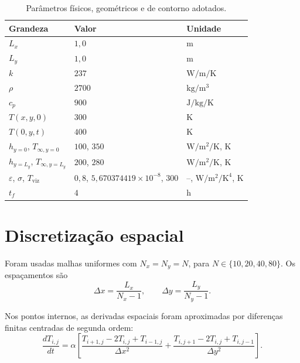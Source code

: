 \documentclass[12pt,a4paper]{article}
\newcommand{\toprule}{\hline}
\newcommand{\midrule}{\hline}
\newcommand{\bottomrule}{\hline}
\newcommand{\si}[1]{\ensuremath{\mathrm{#1}}}
\newcommand{\meter}{m}
\newcommand{\hour}{h}
\newcommand{\kelvin}{K}
\newcommand{\watt}{W}
\newcommand{\kilogram}{kg}
\newcommand{\joule}{J}
\newcommand{\per}{/}
\newcommand{\squared}{^2}
\newcommand{\cubed}{^3}
\newcommand{\tothe}[1]{^{#1}}
\begin{document}
\begin{table}[htbp]
\centering
\caption{Parâmetros físicos, geométricos e de contorno adotados.}
\label{tab:parametros}
\begin{tabular}{lll}
\toprule
Grandeza & Valor & Unidade \\
\midrule
$L_x$ & $1{,}0$ & \si{\meter} \\
$L_y$ & $1{,}0$ & \si{\meter} \\
$k$ & $237$ & \si{\watt\per\meter\per\kelvin} \\
$\rho$ & $2700$ & \si{\kilogram\per\meter\cubed} \\
$c_p$ & $900$ & \si{\joule\per\kilogram\per\kelvin} \\
$T(x,y,0)$ & $300$ & \si{\kelvin} \\
$T(0,y,t)$ & $400$ & \si{\kelvin} \\
$h_{y=0}$, $T_{\infty,y=0}$ & $100$, $350$ & \si{\watt\per\meter\squared\per\kelvin}, \si{\kelvin} \\
$h_{y=L_y}$, $T_{\infty,y=L_y}$ & $200$, $280$ & \si{\watt\per\meter\squared\per\kelvin}, \si{\kelvin} \\
$\varepsilon$, $\sigma$, $T_{\text{viz}}$ & $0{,}8$, $5{,}670374419\times10^{-8}$, $300$ & --, \si{\watt\per\meter\squared\per\kelvin\tothe{4}}, \si{\kelvin} \\
$t_f$ & $4$ & \si{\hour} \\
\bottomrule
\end{tabular}
\end{table}

\section{Discretização espacial}

Foram usadas malhas uniformes com $N_x=N_y=N$, para
$N\in\{10,20,40,80\}$. Os espaçamentos são
\begin{equation}
    \Delta x = \frac{L_x}{N_x-1},
    \qquad
    \Delta y = \frac{L_y}{N_y-1}.
\end{equation}

Nos pontos internos, as derivadas espaciais foram aproximadas por diferenças
finitas centradas de segunda ordem:
\begin{equation}
    \frac{dT_{i,j}}{dt}
    =
    \alpha\left[
    \frac{T_{i+1,j}-2T_{i,j}+T_{i-1,j}}{\Delta x^2}
    +
    \frac{T_{i,j+1}-2T_{i,j}+T_{i,j-1}}{\Delta y^2}
    \right].
    \label{eq:fd_interior}
\end{equation}
\end{document}
